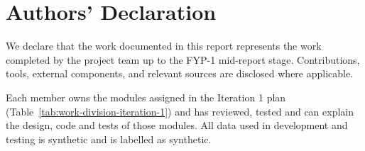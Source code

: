 \chapter*{Authors' Declaration}
We declare that the work documented in this report represents the work completed by the project team up to the FYP-1 mid-report stage. Contributions, tools, external components, and relevant sources are disclosed where applicable.

Each member owns the modules assigned in the Iteration 1 plan (Table~\ref{tab:work-division-iteration-1}) and has reviewed, tested and can explain the design, code and tests of those modules. All data used in development and testing is synthetic and is labelled as synthetic.
